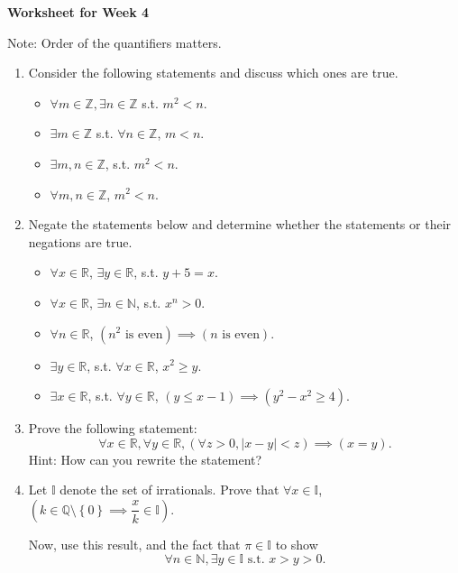 \documentclass[12pt]{article}
\newcommand{\set}[1]{\left\{ #1 \right\}}
\newcommand{\st}{\text{ s.t. }}
\begin{document}
\centerline{\bf\large Worksheet for Week 4}

\vspace{25pt}


Note: Order of the quantifiers matters.

\begin{enumerate}

\item Consider the following statements and discuss which ones are true.

\begin{itemize}
\item $\forall m\in\mathbb Z, \exists n\in\mathbb Z$ s.t. $m^2<n$.
\item $\exists m\in\mathbb Z$ s.t. $\forall n\in\mathbb Z$, $m<n$.
\item $\exists m,n\in\mathbb Z$, s.t. $m^2<n$.
\item $\forall m,n\in\mathbb Z$, $m^2<n$.
\end{itemize}

\item Negate the statements below and determine whether the statements or their negations are true.

\begin{itemize}
\item $\forall x\in\mathbb R$, $\exists y\in\mathbb R$, s.t. $y+5=x$.
\item $\forall x\in\mathbb R$, $\exists n\in\mathbb N$, s.t. $x^n>0$.
\item $\forall n\in\mathbb R$, $(n^2\text{ is even})\implies (n \text{ is even})$.
\item $\exists y\in\mathbb R$, s.t. $\forall x\in\mathbb R$, $x^2\geq y$.
\item $\exists x\in\mathbb R$, s.t. $\forall y\in\mathbb R$, $(y\leq x-1)\implies (y^2-x^2\geq 4)$.
\end{itemize}

\item Prove the following statement:
\[ \forall x\in\mathbb R, \forall y\in\mathbb R, (\forall z>0, |x-y|<z)\implies (x=y).  \]
Hint: How can you rewrite the statement?

\item Let $\mathbb I$ denote the set of irrationals. Prove that $\forall x\in\mathbb I$, $\left(k\in\mathbb{Q}\setminus\set{0}\implies \dfrac{x}{k}\in\mathbb I\right)$.

Now, use this result, and the fact that $\pi\in\mathbb I$ to show
\[\forall n\in\mathbb N, \exists y\in\mathbb I \st x>y>0.\]


\end{enumerate}
\end{document}
